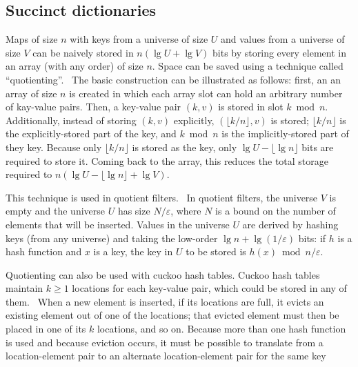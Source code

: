 \documentclass[sigconf, nonacm]{acmart}
\begin{document}
\subsection{Succinct dictionaries}

Maps of size $n$ with keys from a universe of size $U$ and values from a universe of size $V$ can be naively stored in $n (\lg U + \lg V)$ bits by storing every element in an array (with any order) of size $n$.
Space can be saved using a technique called ``quotienting''.~\cite{knuth,quotient-filter}
The basic construction can be illustrated as follows:
first, an an array of size $n$ is created in which each array slot can hold an arbitrary number of kay-value pairs.
Then, a key-value pair $(k, v)$ is stored in slot $k \bmod n$.
Additionally, instead of storing $(k, v)$ explicitly, $(\lfloor k / n \rfloor, v)$ is stored; $\lfloor k / n \rfloor$ is the explicitly-stored part of the key, and $k \bmod n$ is the implicitly-stored part of they key.
Because only $\lfloor k / n \rfloor$ is stored as the key, only $\lg U - \lfloor \lg n \rfloor$ bits are required to store it.
Coming back to the array, this reduces the total storage required to $n (\lg U - \lfloor \lg n \rfloor + \lg V)$.

This technique is used in quotient filters.~\cite{quotient-filter}
In quotient filters, the universe $V$ is empty and the universe $U$ has size $N/\varepsilon$, where $N$ is a bound on the number of elements that will be inserted.
Values in the universe $U$ are derived by hashing keys (from any universe) and taking the low-order $\lg n + \lg (1/\varepsilon)$ bits: if $h$ is a hash function and $x$ is a key, the key in $U$ to be stored is $h(x) \bmod n/\varepsilon$.

Quotienting can also be used with cuckoo hash tables.
Cuckoo hash tables maintain $k \ge 1$ locations for each key-value pair, which could be stored in any of them.~\cite{cuckoo-journal}
When a new element is inserted, if its locations are full, it evicts an existing element out of one of the locations; that evicted element must then be placed in one of its $k$ locations, and so on.
Because more than one hash function is used and because eviction occurs, it must be possible to translate from a location-element pair to an alternate location-element pair for the same key

\end{document}
